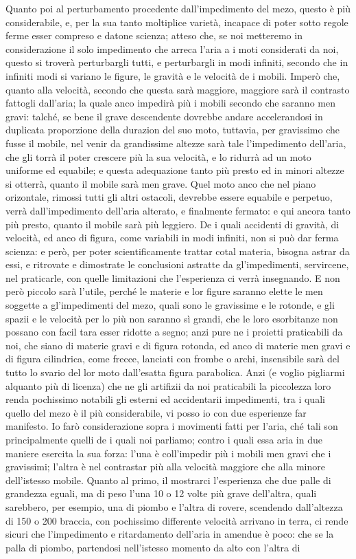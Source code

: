 \documentclass[11pt,twoside,openany]{book}
\begin{document}
Quanto poi al perturbamento procedente dall'impedimento del mezo, questo è più considerabile, e, per la sua tanto moltiplice varietà, incapace di poter sotto regole ferme esser compreso e datone scienza; atteso che, se noi metteremo in considerazione il solo impedimento che arreca l'aria a i moti considerati da noi, questo si troverà perturbargli tutti, e perturbargli in modi infiniti, secondo che in infiniti modi si variano le figure, le gravità e le velocità de i mobili. Imperò che, quanto alla velocità, secondo che questa sarà maggiore, maggiore sarà il contrasto fattogli dall'aria; la quale anco impedirà più i mobili secondo che saranno men gravi: talché, se bene il grave descendente dovrebbe andare accelerandosi in duplicata proporzione della durazion del suo moto, tuttavia, per gravissimo che fusse il mobile, nel venir da grandissime altezze sarà tale l'impedimento dell'aria, che gli torrà il poter crescere più la sua velocità, e lo ridurrà ad un moto uniforme ed equabile; e questa adequazione tanto più presto ed in minori altezze si otterrà, quanto il mobile sarà men grave. Quel moto anco che nel piano orizontale, rimossi tutti gli altri ostacoli, devrebbe essere equabile e perpetuo, verrà dall'impedimento dell'aria alterato, e finalmente fermato: e qui ancora tanto più presto, quanto il mobile sarà più leggiero. De i quali accidenti di gravità, di velocità, ed anco di figura, come variabili in modi infiniti, non si può dar ferma scienza: e però, per poter scientificamente trattar cotal materia, bisogna astrar da essi, e ritrovate e dimostrate le conclusioni astratte da gl'impedimenti, servircene, nel praticarle, con quelle limitazioni che l'esperienza ci verrà insegnando. E non però piccolo sarà l'utile, perché le materie e lor figure saranno elette le men soggette a gl'impedimenti del mezo, quali sono le gravissime e le rotonde, e gli spazii e le velocità per lo più non saranno sì grandi, che le loro esorbitanze non possano con facil tara esser ridotte a segno; anzi pure ne i proietti praticabili da noi, che siano di materie gravi e di figura rotonda, ed anco di materie men gravi e di figura cilindrica, come frecce, lanciati con frombe o archi, insensibile sarà del tutto lo svario del lor moto dall'esatta figura parabolica. Anzi (e voglio pigliarmi alquanto più di licenza) che ne gli artifizii da noi praticabili la piccolezza loro renda pochissimo notabili gli esterni ed accidentarii impedimenti, tra i quali quello del mezo è il più considerabile, vi posso io con due esperienze far manifesto. Io farò considerazione sopra i movimenti fatti per l'aria, ché tali son principalmente quelli de i quali noi parliamo; contro i quali essa aria in due maniere esercita la sua forza: l'una è coll'impedir più i mobili men gravi che i gravissimi; l'altra è nel contrastar più alla velocità maggiore che alla minore dell'istesso mobile. Quanto al primo, il mostrarci l'esperienza che due palle di grandezza eguali, ma di peso l'una 10 o 12 volte più grave dell'altra, quali sarebbero, per esempio, una di piombo e l'altra di rovere, scendendo dall'altezza di 150 o 200 braccia, con pochissimo differente velocità arrivano in terra, ci rende sicuri che l'impedimento e ritardamento dell'aria in amendue è poco: che se la palla di piombo, partendosi nell'istesso momento da alto con l'altra di 
\end{document}
